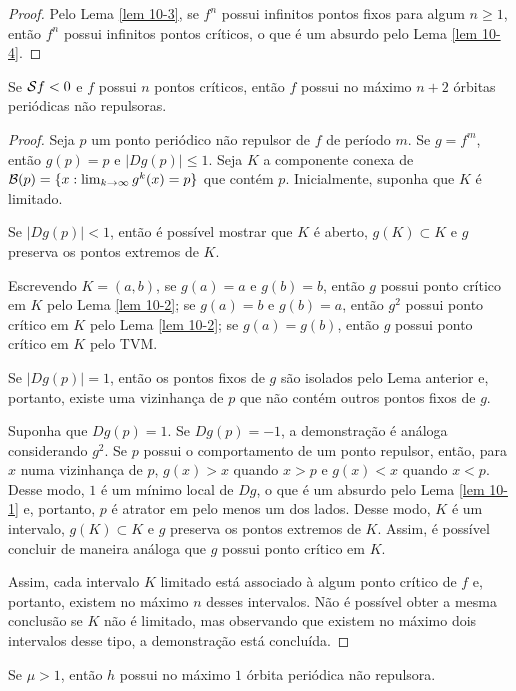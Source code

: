\begin{proof}
Pelo Lema \ref{lem 10-3}, se $f^n$ possui infinitos pontos fixos para algum $n \geq 1$, então $f^n$ possui infinitos pontos críticos, o que é um absurdo pelo Lema \ref{lem 10-4}.
\end{proof}

\begin{theorem}[Singer]
Se $\mathcal{S} f < 0$ e $f$ possui $n$ pontos críticos, então $f$ possui no máximo $n+2$ órbitas periódicas não repulsoras.
\end{theorem}

\begin{proof}
Seja $p$ um ponto periódico não repulsor de $f$ de período $m$.
Se $g = f^m$, então $g(p) = p$ e $|D g(p)| \leq 1$.
Seja $K$ a componente conexa de $\mathcal{B}(p) = \lbrace x : \lim_{k \to \infty} g^k(x) = p \rbrace$ que contém $p$.
Inicialmente, suponha que $K$ é limitado.

Se $|D g(p)| < 1$, então é possível mostrar que $K$ é aberto, $g(K) \subset K$ e $g$ preserva os pontos extremos de $K$.

Escrevendo $K = (a, b)$, se $g(a) = a$ e $g(b) = b$, então $g$ possui ponto crítico em $K$ pelo Lema \ref{lem 10-2}; se $g(a) = b$ e $g(b) = a$, então $g^2$ possui ponto crítico em $K$ pelo Lema \ref{lem 10-2}; se $g(a) = g(b)$, então $g$ possui ponto crítico em $K$ pelo TVM.

Se $|D g(p)| = 1$, então os pontos fixos de $g$ são isolados pelo Lema anterior e, portanto, existe uma vizinhança de $p$ que não contém outros pontos fixos de $g$.

Suponha que $D g(p) = 1$.
Se $D g(p) = -1$, a demonstração é análoga considerando $g^2$.
Se $p$ possui o comportamento de um ponto repulsor, então, para $x$ numa vizinhança de $p$, $g(x) > x$ quando $x > p$ e $g(x) < x$ quando $x < p$.
Desse modo, $1$ é um mínimo local de $D g$, o que é um absurdo pelo Lema \ref{lem 10-1} e, portanto, $p$ é atrator em pelo menos um dos lados.
Desse modo, $K$ é um intervalo, $g(K) \subset K$ e $g$ preserva os pontos extremos de $K$.
Assim, é possível concluir de maneira análoga que $g$ possui ponto crítico em $K$.

Assim, cada intervalo $K$ limitado está associado à algum ponto crítico de $f$ e, portanto, existem no máximo $n$ desses intervalos.
Não é possível obter a mesma conclusão se $K$ não é limitado, mas observando que existem no máximo dois intervalos desse tipo, a demonstração está concluída.
\end{proof}

\begin{corollary}
Se $\mu > 1$, então $h$ possui no máximo $1$ órbita periódica não repulsora.
\end{corollary}
